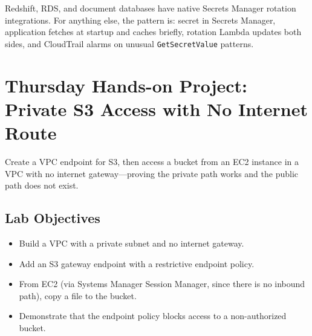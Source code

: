 \begin{tipbox}
Redshift, RDS, and document databases have native Secrets Manager rotation integrations. For anything else, the pattern is: secret in Secrets Manager, application fetches at startup and caches briefly, rotation Lambda updates both sides, and CloudTrail alarms on unusual \texttt{GetSecretValue} patterns.
\end{tipbox}

\section{Thursday Hands-on Project: Private S3 Access with No Internet Route}
Create a VPC endpoint for S3, then access a bucket from an EC2 instance in a VPC with no internet gateway---proving the private path works and the public path does not exist.

\subsection*{Lab Objectives}
\begin{itemize}
    \item Build a VPC with a private subnet and no internet gateway.
    \item Add an S3 gateway endpoint with a restrictive endpoint policy.
    \item From EC2 (via Systems Manager Session Manager, since there is no inbound path), copy a file to the bucket.
    \item Demonstrate that the endpoint policy blocks access to a non-authorized bucket.
\end{itemize}

